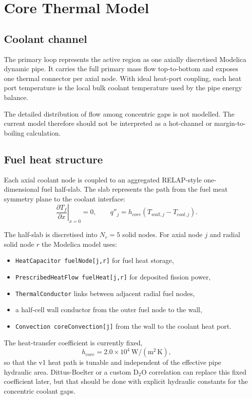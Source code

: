 \documentclass[11pt]{article}
\begin{document}
\section{Core Thermal Model}

\subsection{Coolant channel}

The primary loop represents the active region as one axially discretised
Modelica dynamic pipe.  It carries the full primary mass flow top-to-bottom
and exposes one thermal connector per axial node.  With ideal heat-port
coupling, each heat port temperature is the local bulk coolant temperature
used by the pipe energy balance.

The detailed distribution of flow among concentric gaps is not modelled.
The current model therefore should not be interpreted as a hot-channel or
margin-to-boiling calculation.

\subsection{Fuel heat structure}

Each axial coolant node is coupled to an aggregated RELAP-style one-dimensional
fuel half-slab.  The slab represents the path from the fuel meat symmetry
plane to the coolant interface:
\[
\left.\frac{\partial T_f}{\partial x}\right|_{x=0}=0,
\qquad
q''_j = h_{core}\left(T_{wall,j}-T_{cool,j}\right).
\]

The half-slab is discretised into $N_r=5$ solid nodes.  For axial node $j$
and radial solid node $r$ the Modelica model uses:
\begin{itemize}
  \item \texttt{HeatCapacitor fuelNode[j,r]} for fuel heat storage,
  \item \texttt{PrescribedHeatFlow fuelHeat[j,r]} for deposited fission power,
  \item \texttt{ThermalConductor} links between adjacent radial fuel nodes,
  \item a half-cell wall conductor from the outer fuel node to the wall,
  \item \texttt{Convection coreConvection[j]} from the wall to the coolant heat port.
\end{itemize}

The heat-transfer coefficient is currently fixed,
\[
h_{core}=2.0\times 10^4\ \mathrm{W/(m^2\,K)},
\]
so that the v1 heat path is tunable and independent of the effective pipe
hydraulic area.  Dittus-Boelter or a custom D$_2$O correlation can replace
this fixed coefficient later, but that should be done with explicit hydraulic
constants for the concentric coolant gaps.
\end{document}
